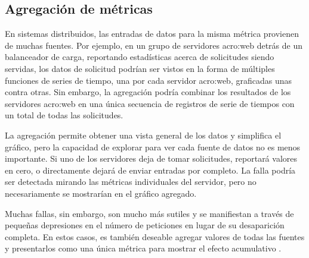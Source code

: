 \subsection*{Agregación de métricas}
\label{agregacion_de_metricas}

En sistemas distribuidos, las entradas de datos para la misma métrica provienen
de muchas fuentes. Por ejemplo, en un grupo de servidores \gls{acro:web} detrás
de un balanceador de carga, reportando estadísticas acerca de solicitudes
siendo servidas, los datos de solicitud podrían ser vistos en la forma de
múltiples funciones de series de tiempo, una por cada servidor \gls{acro:web},
graficadas unas contra otras. Sin embargo, la agregación podría combinar los
resultados de los servidores \gls{acro:web} en una única secuencia de registros
de serie de tiempos con un total de todas las solicitudes.

La agregación permite obtener una vista general de los datos y simplifica el
gráfico, pero la capacidad de explorar para ver cada fuente de datos no es
menos importante. Si  uno de los servidores deja de tomar solicitudes,
reportará valores en cero, o directamente dejará de enviar entradas por
completo. La falla podría ser detectada mirando las métricas individuales del
servidor, pero no necesariamente se mostrarían en el gráfico agregado.

Muchas fallas, sin embargo, son mucho más sutiles y se manifiestan a través de
pequeñas depresiones en el número de peticiones en lugar de su desaparición
completa. En estos casos, es también deseable agregar valores de todas las
fuentes y presentarlos como una única métrica para mostrar el efecto
acumulativo \cite[p.~21-25]{monitoreo:efective_monitoring_and_alerting}.

